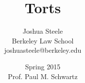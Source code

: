 \documentclass[letterpaper,titlepage]{article}
\begin{document}
\title{Torts}
\author{Joshua Steele\\Berkeley Law School\\joshuasteele@berkeley.edu}
\date{Spring 2015\\Prof. Paul M. Schwartz}
\maketitle
\tableofcontents
\pagebreak

\newpage

\newpage
\newpage
\newpage
\newpage
\newpage
\newpage
\newpage
\newpage
\newpage
\end{document}
